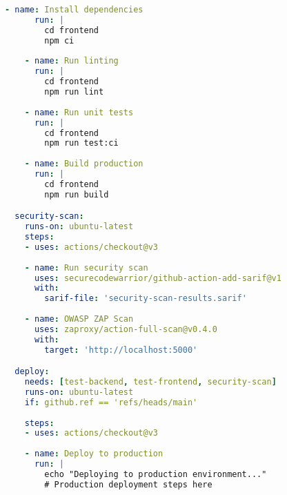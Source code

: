 \documentclass[12pt,a4paper]{report}
\begin{document}
\begin{lstlisting}[language=yaml, caption=GitHub Actions CI/CD Pipeline]
    - name: Install dependencies
      run: |
        cd frontend
        npm ci
    
    - name: Run linting
      run: |
        cd frontend
        npm run lint
    
    - name: Run unit tests
      run: |
        cd frontend
        npm run test:ci
    
    - name: Build production
      run: |
        cd frontend
        npm run build

  security-scan:
    runs-on: ubuntu-latest
    steps:
    - uses: actions/checkout@v3
    
    - name: Run security scan
      uses: securecodewarrior/github-action-add-sarif@v1
      with:
        sarif-file: 'security-scan-results.sarif'
    
    - name: OWASP ZAP Scan
      uses: zaproxy/action-full-scan@v0.4.0
      with:
        target: 'http://localhost:5000'

  deploy:
    needs: [test-backend, test-frontend, security-scan]
    runs-on: ubuntu-latest
    if: github.ref == 'refs/heads/main'
    
    steps:
    - uses: actions/checkout@v3
    
    - name: Deploy to production
      run: |
        echo "Deploying to production environment..."
        # Production deployment steps here
\end{lstlisting}
\end{document}
